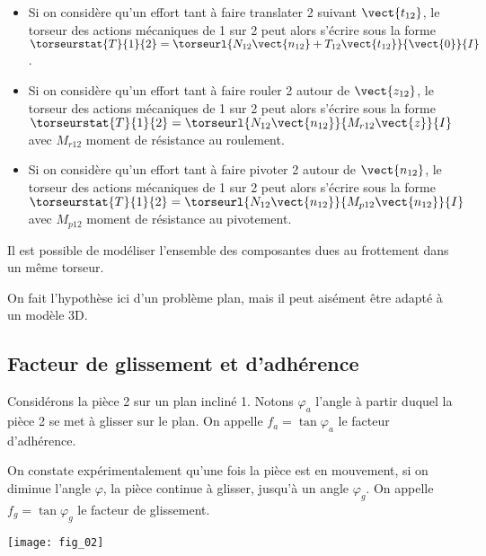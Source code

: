\begin{itemize}
\item Si on considère qu'un effort tant à faire translater 2 suivant $\vect{t_{12}}$, le torseur des actions mécaniques de 1 sur 2 peut alors s'écrire sous la forme $\torseurstat{T}{1}{2}=\torseurl{N_{12} \vect{n_{12}}+T_{12} \vect{t_{12}}}{\vect{0}}{I}$.
\item Si on considère qu'un effort tant à faire rouler 2 autour de $\vect{z_{12}}$, le torseur des actions mécaniques de 1 sur 2 peut alors s'écrire sous la forme $\torseurstat{T}{1}{2}=\torseurl{N_{12} \vect{n_{12}}}{M_{r12} \vect{z}}{I}$ avec $M_{r12}$ moment de résistance au roulement.
\item Si on considère qu'un effort tant à faire pivoter 2 autour de $\vect{n_{12}}$, le torseur des actions mécaniques de 1 sur 2 peut alors s'écrire sous la forme $\torseurstat{T}{1}{2}=\torseurl{N_{12} \vect{n_{12}}}{M_{p12} \vect{n_{12}}}{I}$ avec $M_{p12}$ moment de résistance au pivotement.
\end{itemize}

\begin{rem}
Il est possible de modéliser l'ensemble des composantes dues au frottement dans un même torseur. 

On fait l'hypothèse ici d'un problème plan, mais il peut aisément être adapté à un modèle 3D. 
\end{rem}

\subsection{Facteur de glissement et d'adhérence}
\noindent\begin{minipage}[c]{.7\linewidth}
Considérons la pièce 2 sur un plan incliné 1. Notons $\varphi_a$ l'angle à partir duquel la pièce 2 se met à glisser sur le plan. On appelle  $f_a=\tan\varphi_a$ le facteur d'adhérence.

On constate expérimentalement qu'une fois la pièce est en mouvement, si on diminue l'angle $\varphi$, la pièce continue à glisser, jusqu'à un angle  $\varphi_g$. On appelle \textbf{$f_g=\tan\varphi_g$} le facteur de glissement.
\end{minipage}\hfill
\begin{minipage}[c]{.25\linewidth}
\begin{center}
\texttt{[image: fig\_02]}
\end{center}
\end{minipage}

